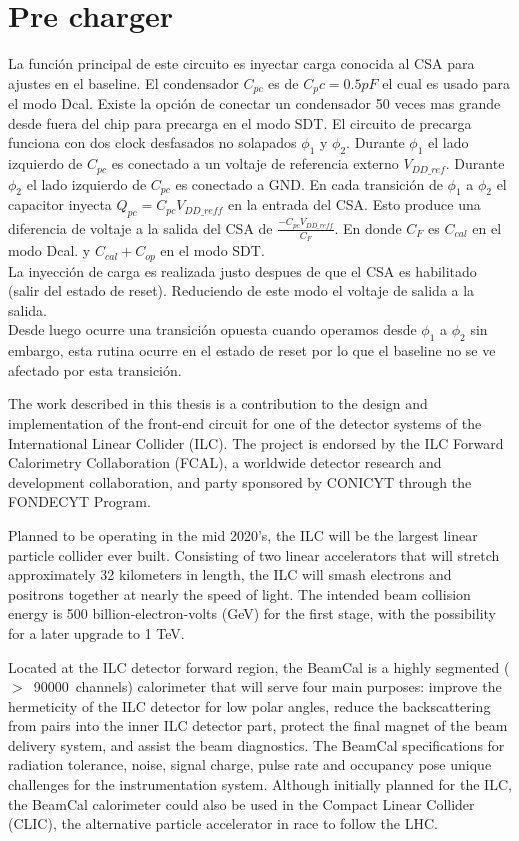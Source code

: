 \section{Pre charger}
La función principal de este circuito es inyectar carga conocida al CSA para ajustes en el baseline. El condensador $C_{pc}$ es de $C_pc=0.5pF$ el cual es usado para el modo Dcal. Existe la opción de conectar un condensador 50 veces mas grande desde fuera del chip para precarga en el modo SDT.
El circuito de precarga funciona con dos clock desfasados no solapados $\phi_1$ y $\phi_2$. Durante $\phi_1$ el lado izquierdo de $C_{pc}$ es conectado a un voltaje de referencia externo $V_{DD\_ref}$. Durante $\phi_2$ el lado izquierdo de $C_{pc}$ es conectado a GND. En cada transición de $\phi_1$ a $\phi_2$ el capacitor inyecta $Q_{pc}=C_{pc} V_{DD\_reff}$ en la entrada del CSA. Esto produce una diferencia de voltaje a la salida del CSA de $\frac{-C_{pc}V_{DD\_reff}}{C_F}$.
En donde $C_F$ es $C_{cal}$ en el modo Dcal. y $C_{cal}+C_{op}$ en el modo SDT.\\

La inyección de carga es realizada justo despues de que el CSA es habilitado (salir del estado de reset). Reduciendo de este modo el voltaje de salida a la salida.\\

Desde luego ocurre una transición opuesta cuando operamos desde $\phi_1$ a $\phi_2$ sin embargo, esta rutina ocurre en el estado de reset por lo que el baseline no se ve afectado por esta transición.


The work described in this thesis is a contribution to the design and implementation of the front-end circuit for one of the detector systems of the International Linear Collider (ILC). The project is endorsed by the ILC Forward Calorimetry Collaboration (FCAL), a worldwide detector research and development collaboration, and party sponsored by CONICYT through the FONDECYT Program.

Planned to be operating in the mid 2020’s, the ILC will be the largest linear particle collider ever built. Consisting of two linear accelerators that will stretch approximately 32 kilometers in length, the ILC will smash electrons and positrons together at nearly the speed of light. The intended beam collision energy is 500 billion-electron-volts (GeV) for the first stage, with the possibility for a later upgrade to 1 TeV. 
 
Located at the ILC detector forward region, the BeamCal is a highly segmented \mbox{($>$ 90000 channels)} calorimeter that will serve four main purposes: improve the hermeticity of the ILC detector for low polar angles, reduce the backscattering from pairs into the inner ILC detector part, protect the final magnet of the beam delivery system, and assist the beam diagnostics. The BeamCal specifications for radiation tolerance, noise, signal charge, pulse rate and occupancy pose unique challenges for the instrumentation system. Although initially planned  for the ILC, the BeamCal calorimeter could also be used in the Compact Linear Collider (CLIC), the alternative particle accelerator in race to follow the LHC.

